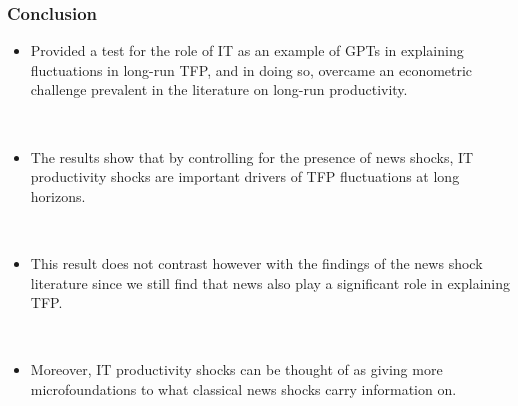 \documentclass{beamer}
\begin{document}
\begin{frame}
	\frametitle{Conclusion} 
	
\begin{itemize}
\item Provided a test for the role of IT as an example of GPTs in explaining fluctuations in long-run TFP, and in doing so, overcame an econometric challenge prevalent in the literature on long-run productivity.

\ 

\item The results show that by controlling for the presence of news shocks, IT productivity shocks are important drivers of TFP fluctuations at long horizons.

\

\item This result does not contrast however with the findings of the news shock literature since we still find that news also play a significant role in explaining TFP. 

\

\item Moreover, IT productivity shocks can be thought of as giving more microfoundations to what classical news shocks carry information on. 

\end{itemize}
   		 	
\end{frame}
\end{document}
